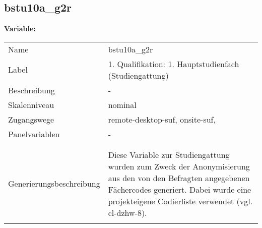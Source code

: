 	
	
	\subsection{bstu10a\_g2r}
	\label{subSection:bstu10a_g2r}

	\noindent\textbf{Variable:}\\
		\begin{tabular}{lL{11.3cm}}
			\label{tableVariable:bstu10a_g2r}
			Name & bstu10a\_g2r \\
			Label & 1. Qualifikation: 1. Hauptstudienfach (Studiengattung) \\
			Beschreibung & - \\
			Skalenniveau & nominal \\
			Zugangswege &
				remote-desktop-suf,
				onsite-suf,
 \\
			Panelvariablen & -
			 \\
			 \\
 \\
					Generierungsbeschreibung & Diese Variable zur Studiengattung wurden zum Zweck der Anonymisierung aus den von den Befragten angegebenen Fächercodes generiert.  Dabei wurde eine projekteigene Codierliste verwendet (vgl. cl-dzhw-8).
				 \\	
			 \\
		\end{tabular}






